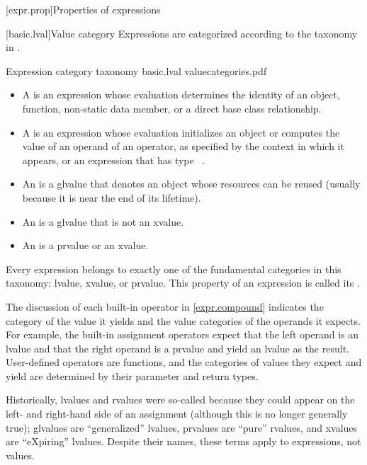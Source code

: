 [expr.prop]{Properties of expressions}

[basic.lval]{Value category}
\pnum
Expressions are categorized according to the taxonomy in .

\begin{importgraphic}
{Expression category taxonomy}
{basic.lval}
{valuecategories.pdf}
\end{importgraphic}

\begin{itemize}
\item A  is an expression
whose evaluation determines the identity of
an object, function, non-static data member, or
a direct base class relationship.
\item A  is an expression whose evaluation initializes an object
or computes the value of an operand of an operator,
as specified by the context in which it appears,
or an expression that has type \cv{}~.
\item An  is a glvalue that denotes an object whose resources can be reused (usually because it is near the end of its lifetime).
\item An  is a glvalue that is not an xvalue.
\item An  is a prvalue or an xvalue.
\end{itemize}

\pnum
Every expression belongs to exactly one of the fundamental categories in this
taxonomy: lvalue, xvalue, or prvalue. This property of an expression is called
its .
\begin{note}
The discussion of each built-in operator in
\ref{expr.compound} indicates the category of the value it yields and the value categories
of the operands it expects. For example, the built-in assignment operators expect that
the left operand is an lvalue and that the right operand is a prvalue and yield an
lvalue as the result. User-defined operators are functions, and the categories of
values they expect and yield are determined by their parameter and return types.
\end{note}

\pnum
\begin{note}
Historically, lvalues and rvalues were so-called
because they could appear on the left- and right-hand side of an assignment
(although this is no longer generally true);
glvalues are ``generalized'' lvalues,
prvalues are ``pure'' rvalues,
and xvalues are ``eXpiring'' lvalues.
Despite their names, these terms apply to expressions, not values.
\end{note}

